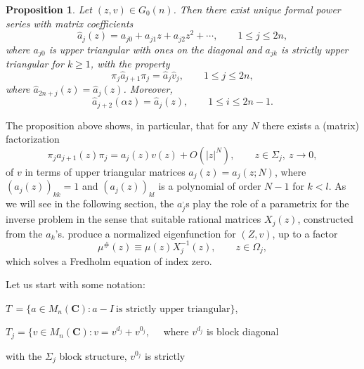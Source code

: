 \documentclass{surv-l}
\theoremstyle{plain}
\newtheorem{prop}[theorem]{Proposition}
\theoremstyle{definition}
\numberwithin{equation}{chapter}
\begin{document}
\renewcommand\thetheorem{25.1}
\setcounter{theorem}{0}
\begin{prop}\label{pro25.1}
Let $(z, v) \in G_{0}(n)$. Then there exist unique formal power series with matrix coefficients
\begin{equation*}
\hat{a}_{j}(z)=a_{j 0}+a_{j 1}z+a_{j2}z^{2}+\cdots,  \qquad 1\leq j\leq 2n,
\end{equation*}
where $a_{j0}$ is upper triangular with ones on the diagonal and $a_{jk}$ is strictly upper triangular for $k\geq 1$, with the property
\renewcommand\theequation{25.\arabic{equation}}
\setcounter{equation}{1}
\begin{equation}\label{eq25.2}
\pi_{j}\hat{a}_{j+1}\pi_{j}=\hat{a}_{j}\hat{v}_{j}, \qquad 1\leq j\leq 2n,
\end{equation}
where $\hat{a}_{2n+j}(z)=\hat{a}_{j}(z)$. Moreover,
\begin{equation}\label{eq25.3}
\hat{a}_{j+2}(\alpha z)=\hat{a}_{j}(z),\qquad 1\leq i\leq 2n-1.
\end{equation}
\end{prop}


The proposition above shows, in particular, that for any $N$ there exists a (matrix) factorization
\renewcommand\theequation{25.\arabic{equation}}
\setcounter{equation}{3}
\begin{equation}\label{eq25.4}
\pi_{j}a_{j+1}(z)\pi_{j}=a_{j}(z)v(z)+O(|z|^{N}), \qquad z\in\Sigma_{j},\ z\rightarrow 0,
\end{equation}
of $v$ in terms of upper triangular matrices $a_{j}(z)=a_{j}(z; N)$, where $(a_{j}(z))_{kk}=1$ and $(a_{j}(z))_{kl}$ is a polynomial of order $N-1$ for $k<l$. As we will see in the following section, the $a_{j}^{,}$s play the role of a parametrix for the inverse problem in the sense that suitable rational matrices $X_{j}(z)$, constructed from the $a_{k}$'s. produce a normalized eigenfunction for $(Z, v)$, up to a factor
\begin{equation*}
\mu^{\#}(z)\equiv\mu(z)X_{j}^{-1}(z), \qquad z\in\Omega_{j},
\end{equation*}
which solves a Fredholm equation of index zero.

Let us start with some notation:

$T\,=\{a\in M_{n}(\textbf{C}):a-I \ \text{is strictly upper triangular}\}$,

$T_{j}=\{v\in M_{n}(\textbf{C}):v=v^{d_{j}}+v^{0_{j}},\quad$ where $v^{d_{j}}$ is block diagonal

\qquad \qquad with the $\Sigma_{j}$ block structure, $v^{0_{j}}$ is strictly
\end{document}
